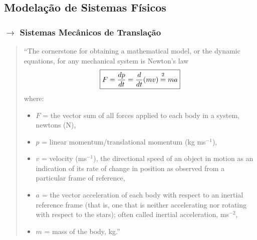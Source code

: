 \renewcommand*{\thefootnote}{\fnsymbol{footnote}}
\def\equalfootnote{\mathrel{\ensurestackMath{\stackon[0.5pt]{=}{\footnotemark[2]}}}}

\makeatletter
\newcommand{\smallbullet}{} %
\DeclareRobustCommand\smallbullet{%
  \mathord{\mathpalette\smallbullet@{0.75}}%
}
\newcommand{\smallbullet@}[2]{%
  \vcenter{\hbox{\scalebox{#2}{$\m@th#1\bullet$}}}%
}
\makeatother
\subsection[2.2 Modelação de Sistemas Físicos]{\hspace*{0.075 em}\raisebox{0.2 em}{$\pmb{\drsh}$} Modelação de Sistemas Físicos}
\label{sec:mechanics}
\subsubsection[2.2.1 Sistemas Mecânicos de Translação]{$\pmb{\rightarrow}$ Sistemas Mecânicos de Translação}
\label{sec:mechanics-translation}

\begin{quote}
    ``The cornerstone for obtaining a mathematical model, or the dynamic equations, for any mechanical system is Newton's law
    $$
        \boxed{F = \frac{dp}{dt} = \frac{d}{dt} (m v) \equalfootnote ma}
    $$
    \noindent where:
    \begin{itemize}[leftmargin=*,label=${\smallbullet}$]
        \item $F$ = the vector sum of all forces applied to each body in a system, newtons (N),
        \item $p$ = linear momentum/translational momentum (kg ms$^{-1}$),
        \item $v$ = velocity (ms$^{-1}$), the directional speed of an object in motion as an indication of its rate of change in position as observed from a particular frame of reference,
        \item $a$ = the vector acceleration of each body with respect to an inertial reference frame (that is, one that is neither accelerating nor rotating with respect to the stars); often called inertial acceleration, ms$^{-2}$,
        \item $m$ = mass of the body, kg.''\cite{FranklinPowell2015}
    \end{itemize}
\end{quote}

